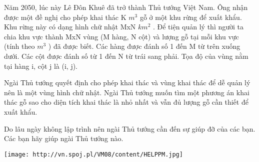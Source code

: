 Năm 2050, lúc này Lê Đôn Khuê đã trở thành Thủ tướng Việt Nam. Ông nhận được một đề nghị cho phép khai thác K $m^{3}$ gỗ ở một khu rừng để xuất khẩu. Khu rừng này có dạng hình chữ nhật MxN $km^{2}$ . Để tiện quản lý thì người ta chia khu vực thành MxN vùng (M hàng, N cột) và lượng gỗ tại mỗi khu vực (tính theo $m^{3}$ ) đã được biết. Các hàng được đánh số 1 đến M từ trên xuống dưới. Các cột được đánh số từ 1 đến N từ trái sang phải. Tọa độ của vùng nằm tại hàng i, cột j là (i, j).

Ngài Thủ tướng quyết định cho phép khai thác và vùng khai thác để dễ quản lý nên là một vùng hình chữ nhật. Ngài Thủ tướng muốn tìm một phương án khai thác gỗ sao cho diện tích khai thác là nhỏ nhất và vẫn đủ lượng gỗ cần thiết để xuất khẩu.

Do lâu ngày không lập trình nên ngài Thủ tướng cần đến sự giúp đỡ của các bạn. Các bạn hãy giúp ngài Thủ tướng nào.


\texttt{[image: http://vn.spoj.pl/VM08/content/HELPPM.jpg]}

 
